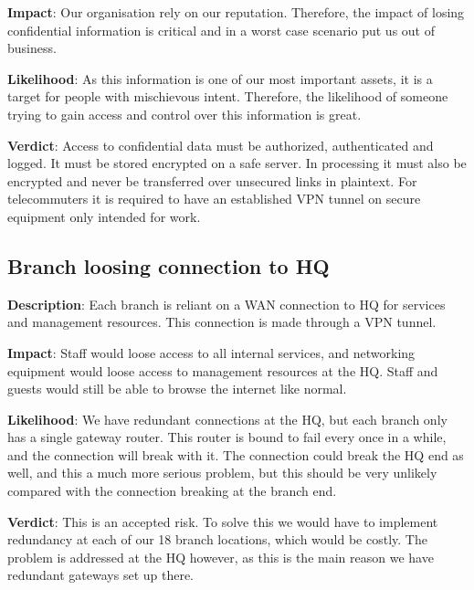 \textbf{Impact}: Our organisation rely on our reputation. Therefore, the impact of losing confidential information is critical and in a worst case scenario put us out of business.

\textbf{Likelihood}: As this information is one of our most important assets, it is a target for people with mischievous intent. Therefore, the likelihood of someone trying to gain access and control over this information is great.

\textbf{Verdict}: Access to confidential data must be authorized, authenticated and logged. It must be stored encrypted on a safe server. In processing it must also be encrypted and never be transferred over unsecured links in plaintext. For telecommuters it is required to have an established VPN tunnel on secure equipment only intended for work.

%

\subsection{Branch loosing connection to HQ}

\textbf{Description}: Each branch is reliant on a WAN connection to HQ for services and management resources. This connection is made through a VPN tunnel.

\textbf{Impact}: Staff would loose access to all internal services, and networking equipment would loose access to management resources at the HQ. Staff and guests would still be able to browse the internet like normal.

\textbf{Likelihood}: We have redundant connections at the HQ, but each branch only has a single gateway router. This router is bound to fail every once in a while, and the connection will break with it. The connection could break the HQ end as well, and this a much more serious problem, but this should be very unlikely compared with the connection breaking at the branch end.

\textbf{Verdict}: This is an accepted risk. To solve this we would have to implement redundancy at each of our 18 branch locations, which would be costly. The problem is addressed at the HQ however, as this is the main reason we have redundant gateways set up there.


